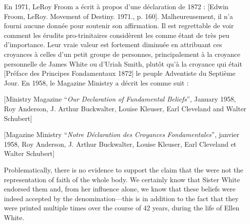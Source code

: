 En 1971, LeRoy Froom a écrit à propos d'une déclaration de 1872 : [Edwin Froom, LeRoy. Movement of Destiny. 1971., p. 160]. Malheureusement, il n'a fourni aucune donnée pour soutenir son affirmation. Il est regrettable de voir comment les érudits pro-trinitaires considèrent les  comme étant de très peu d'importance. Leur vraie valeur est fortement diminuée en attribuant ces croyances à celles d'un petit groupe de personnes, principalement à la croyance personnelle de James White ou d'Uriah Smith, plutôt qu'à la croyance qui était [Préface des Principes Fondamentaux 1872] le peuple Adventiste du Septième Jour. En 1958, le Magazine Ministry a décrit les  comme suit :


[Ministry Magazine “\textit{Our Declaration of Fundamental Beliefs}”, January 1958, Roy Anderson, J. Arthur Buckwalter, Louise Kleuser, Earl Cleveland and Walter Schubert]


[Magazine Ministry “\textit{Notre Déclaration des Croyances Fondamentales}”, janvier 1958, Roy Anderson, J. Arthur Buckwalter, Louise Kleuser, Earl Cleveland et Walter Schubert]


Problematically, there is no evidence to support the claim that the  were not the representation of faith of the whole body. We certainly know that Sister White endorsed them and, from her influence alone, we know that these beliefs were indeed accepted by the denomination—this is in addition to the fact that they were printed multiple times over the course of 42 years, during the life of Ellen White.


